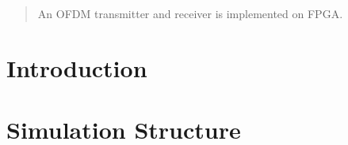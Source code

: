 \begin{abstract}
An OFDM transmitter and receiver is implemented on FPGA.
\end{abstract}

\section{Introduction}


\section{Simulation Structure}
\label{sec_simstruct}
